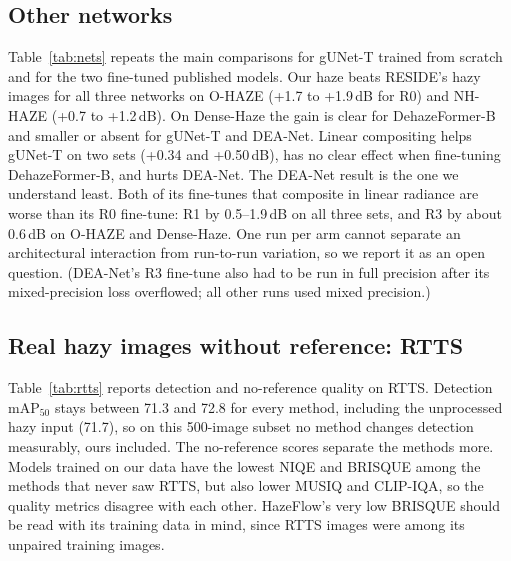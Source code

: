 \documentclass{article}
\begin{document}
\subsection{Other networks}
Table~\ref{tab:nets} repeats the main comparisons for gUNet-T trained from scratch and for the two fine-tuned published models. Our haze beats RESIDE's hazy images for all three networks on O-HAZE (+1.7 to +1.9\,dB for R0) and NH-HAZE (+0.7 to +1.2\,dB). On Dense-Haze the gain is clear for DehazeFormer-B and smaller or absent for gUNet-T and DEA-Net. Linear compositing helps gUNet-T on two sets (+0.34 and +0.50\,dB), has no clear effect when fine-tuning DehazeFormer-B, and hurts DEA-Net. The DEA-Net result is the one we understand least. Both of its fine-tunes that composite in linear radiance are worse than its R0 fine-tune: R1 by 0.5--1.9\,dB on all three sets, and R3 by about 0.6\,dB on O-HAZE and Dense-Haze. One run per arm cannot separate an architectural interaction from run-to-run variation, so we report it as an open question. (DEA-Net's R3 fine-tune also had to be run in full precision after its mixed-precision loss overflowed; all other runs used mixed precision.)

\begin{table}[t]
\caption{The same comparisons on other networks (PSNR difference in dB, 95\% interval, one seed). For fine-tuned networks, B0 is the published checkpoint fine-tuned on RESIDE's hazy images for the same number of iterations.}
\label{tab:nets}
\centering
\small
\resizebox{\linewidth}{!}{}
\end{table}

\subsection{Real hazy images without reference: RTTS}
Table~\ref{tab:rtts} reports detection and no-reference quality on RTTS. Detection mAP$_{50}$ stays between 71.3 and 72.8 for every method, including the unprocessed hazy input (71.7), so on this 500-image subset no method changes detection measurably, ours included. The no-reference scores separate the methods more. Models trained on our data have the lowest NIQE and BRISQUE among the methods that never saw RTTS, but also lower MUSIQ and CLIP-IQA, so the quality metrics disagree with each other. HazeFlow's very low BRISQUE should be read with its training data in mind, since RTTS images were among its unpaired training images.

\begin{table}[t]
\caption{RTTS (no reference): detection mAP$_{50}$ (YOLOv8m, 500 images) and no-reference quality (100 images). $^\dagger$HazeFlow is scored from its published outputs; its training data include RTTS.}
\label{tab:rtts}
\centering
\small

\end{table}
\end{document}
